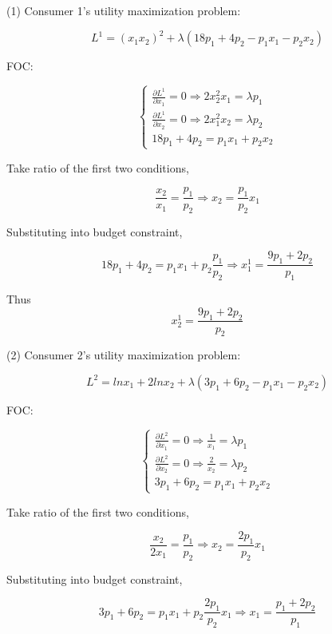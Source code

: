\documentclass{article}
\begin{document}
\vspace{3mm}


(1) Consumer 1's utility maximization problem:

$$L^1 = (x_1x_2)^2 + \lambda (18p_1 +4p_2 - p_1x_1 -p_2x_2) $$

FOC:

\begin{equation}
    \begin{cases}
\frac{\partial L^1}{\partial x_1} = 0  \Rightarrow 2x_2^2x_1 = \lambda p_1 \\
\frac{\partial L^1}{\partial x_2} = 0  \Rightarrow 2x_1^2x_2 = \lambda p_2 \\
18p_1 +4p_2 = p_1x_1 + p_2x_2
    \end{cases}
    \nonumber
\end{equation}

Take ratio of the first two conditions,

$$\frac{x_2}{x_1} = \frac{p_1}{p_2} \Rightarrow x_2 = \frac{p_1}{p_2}  x_1$$

Substituting into budget constraint,

$$18p_1 +4p_2 = p_1x_1 + p_2\frac{p_1}{p_2}   \Rightarrow x^1_1 =\frac{9p_1+2p_2}{p_1}$$

Thus $$x^1_2 = \frac{9p_1+2p_2}{p_2}$$ 

(2) Consumer 2's utility maximization problem:

\vspace{3mm}

$$L^2 = ln x_1 + 2ln x_2 + \lambda (3p_1 +6p_2 - p_1x_1 -p_2x_2) $$

FOC:

\begin{equation}
    \begin{cases}
\frac{\partial L^2}{\partial x_1} = 0  \Rightarrow \frac{1}{x_1} = \lambda p_1 \\
\frac{\partial L^2}{\partial x_2} = 0  \Rightarrow \frac{2}{x_2} = \lambda p_2 \\
3p_1 +6p_2 = p_1x_1 + p_2x_2
    \end{cases}
    \nonumber
\end{equation}

Take ratio of the first two conditions,

$$\frac{x_2}{2x_1} = \frac{p_1}{p_2} \Rightarrow x_2 = \frac{2p_1}{p_2}  x_1$$

Substituting into budget constraint,

$$3p_1 +6p_2 = p_1x_1 + p_2\frac{2p_1}{p_2}  x_1   \Rightarrow x_1 =\frac{p_1+2p_2}{p_1}$$
\end{document}

